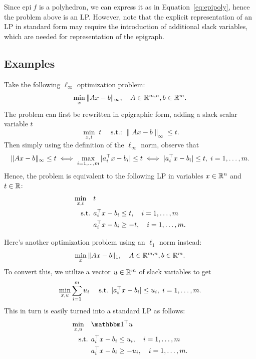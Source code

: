 \documentclass[11 pt]{scrartcl}
\newcommand{\epi}{\text{epi}\;}
\begin{document}
Since $\epi f$ is a polyhedron, we can express it as in Equation~\ref{eq:epipoly}, hence the problem above is an LP. 
However, note that the explicit representation of an LP in standard form may require the introduction of additional slack variables, which are needed for representation of the epigraph.

\subsection{Examples}
\begin{example}
    Take the following $\ell_\infty$ optimization problem: 
    \[ \min_x \|Ax - b\|_\infty, \quad A\in \mathbb R^{m,n}, b\in \mathbb R^{m}.\]
    The problem can first be rewritten in epigraphic form, adding a slack scalar variable $t$ 
    \[ \min_{x,t}\; t\quad \text{ s.t.: } \|Ax-b\|_\infty \leq t.\] 
    Then simply using the definition of the $\ell_\infty$ norm, observe that 
    \[ \|Ax-b\|_\infty \leq t \iff \max_{i=1,\dots,m} |a_i^\top x - b_i| \leq t \iff |a_i^\top x - b_i| \leq t, \; i = 1,\dots, m.\] 
    Hence, the problem is equivalent to the following LP in variables $x\in \mathbb R^n$ and $t\in \mathbb R$: 
    \begin{align*}
        \min_{x,t}\quad &t \\ 
        \text{ s.t. } &a_i^\top x - b_i \leq t, \quad i = 1,\dots, m \\ 
                                           &a_i^\top x - b_i \geq -t, \quad i = 1,\dots, m.
    \end{align*}
\end{example}

\begin{example}
    Here's another optimization problem using an $\ell_1$ norm instead:
    \[ \min_x \|Ax - b\|_1, \quad A\in \mathbb R^{m,n}, b\in \mathbb R^{m}.\]
    To convert this, we utilize a vector $u\in \mathbb R^m$ of slack variables to get 
    \[ \min_{x,u} \sum_{i=1}^m u_i \quad \text{ s.t. } |a_i^\top x - b_i|\leq u_i,\; i=1,\dots, m.\] 
    This in turn is easily turned into a standard LP as follows:
    \begin{align*}
        \min_{x,u}\quad &\one^\T u \\
        \text{ s.t. } &a_i^\T x - b_i \leq u_i, \quad i = 1,\dots, m \\ 
                      &a_i^\T x - b_i \geq -u_i, \quad i = 1,\dots, m.
    \end{align*}
\end{example}
\end{document}
